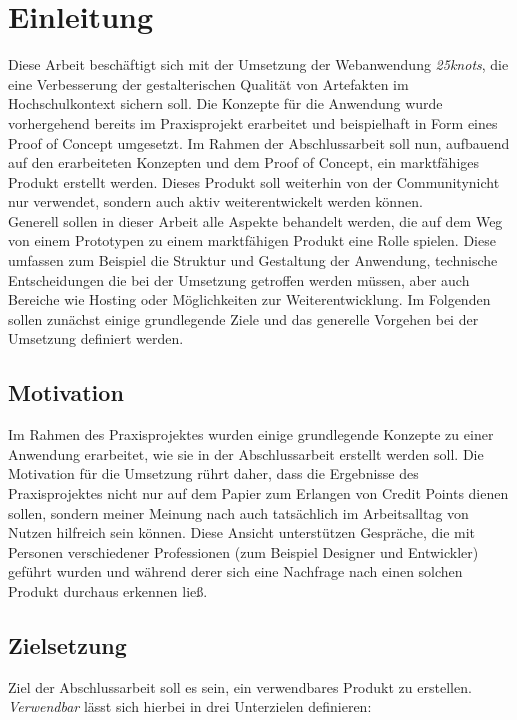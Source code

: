 \chapter{Einleitung}
\thispagestyle{fancy}
Diese Arbeit beschäftigt sich mit der Umsetzung der Webanwendung \textit{25knots}, die eine Verbesserung der gestalterischen Qualität von Artefakten im Hochschulkontext sichern soll.
Die Konzepte für die Anwendung wurde vorhergehend bereits im Praxisprojekt erarbeitet und beispielhaft in Form eines Proof of Concept umgesetzt. Im Rahmen der Abschlussarbeit soll nun, aufbauend auf den erarbeiteten Konzepten und dem Proof of Concept, ein marktfähiges Produkt erstellt werden. Dieses Produkt soll weiterhin von der Community\footnotemark nicht nur verwendet, sondern auch aktiv weiterentwickelt werden können.\\

Generell sollen in dieser Arbeit alle Aspekte behandelt werden, die auf dem Weg von einem Prototypen zu einem marktfähigen Produkt eine Rolle spielen. Diese umfassen zum Beispiel die Struktur und Gestaltung der Anwendung, technische Entscheidungen die bei der Umsetzung getroffen werden müssen, aber auch Bereiche wie Hosting oder Möglichkeiten zur Weiterentwicklung.
Im Folgenden sollen zunächst einige grundlegende Ziele und das generelle Vorgehen bei der Umsetzung definiert werden.


\section{Motivation}
Im Rahmen des Praxisprojektes wurden einige grundlegende Konzepte zu einer Anwendung erarbeitet, wie sie in der Abschlussarbeit erstellt werden soll. Die Motivation für die Umsetzung rührt daher, dass die Ergebnisse des Praxisprojektes nicht nur auf dem Papier zum Erlangen von Credit Points dienen sollen, sondern meiner Meinung nach auch tatsächlich im Arbeitsalltag von Nutzen hilfreich sein können. Diese Ansicht unterstützen Gespräche, die mit Personen verschiedener Professionen (zum Beispiel Designer und Entwickler) geführt wurden und während derer sich eine Nachfrage nach einen solchen Produkt durchaus erkennen ließ.

\section{Zielsetzung}
Ziel der Abschlussarbeit soll es sein, ein verwendbares Produkt zu erstellen. \textit{Verwendbar} lässt sich hierbei in drei Unterzielen definieren:

